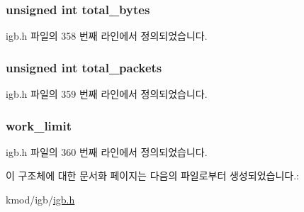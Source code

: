 \subsubsection[{\texorpdfstring{total\+\_\+bytes}{total_bytes}}]{\setlength{\rightskip}{0pt plus 5cm}unsigned int total\+\_\+bytes}\hypertarget{structigb__ring__container_a3ba0a002e956c88f2433d97977c92b59}{}\label{structigb__ring__container_a3ba0a002e956c88f2433d97977c92b59}


igb.\+h 파일의 358 번째 라인에서 정의되었습니다.

\subsubsection[{\texorpdfstring{total\+\_\+packets}{total_packets}}]{\setlength{\rightskip}{0pt plus 5cm}unsigned int total\+\_\+packets}\hypertarget{structigb__ring__container_a6faab394a49c8462592c339de9d60855}{}\label{structigb__ring__container_a6faab394a49c8462592c339de9d60855}


igb.\+h 파일의 359 번째 라인에서 정의되었습니다.

\subsubsection[{\texorpdfstring{work\+\_\+limit}{work_limit}}]{ work\+\_\+limit}\hypertarget{structigb__ring__container_a2b47c2bd8dc8cbb82489685b42113cb2}{}\label{structigb__ring__container_a2b47c2bd8dc8cbb82489685b42113cb2}


igb.\+h 파일의 360 번째 라인에서 정의되었습니다.



이 구조체에 대한 문서화 페이지는 다음의 파일로부터 생성되었습니다.\+:\begin{DoxyCompactItemize}
\item 
kmod/igb/\hyperlink{kmod_2igb_2igb_8h}{igb.\+h}\end{DoxyCompactItemize}
